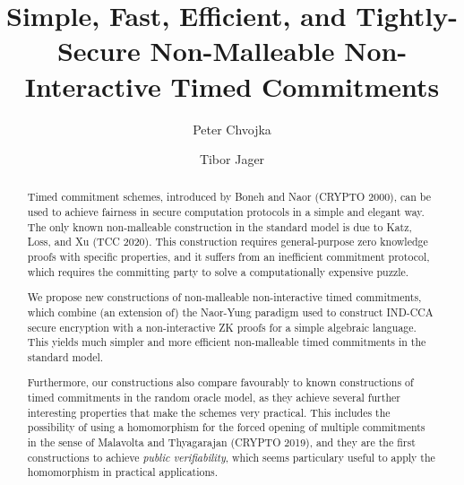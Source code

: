 \documentclass{llncs}
\author{Peter Chvojka\inst{1} \and Tibor Jager\inst{2}}
\institute{IMDEA Software Institute, \url{chvojka.p@gmail.com} \and University of Wuppertal, \url{jager@uni-wuppertal.de}}
\begin{document}
\title{Simple, Fast, Efficient, and Tightly-Secure Non-Malleable Non-Interactive Timed Commitments}


\maketitle
\begin{abstract}
Timed commitment schemes, introduced by Boneh and Naor (CRYPTO 2000), can be used to achieve fairness in secure computation protocols in a simple and elegant way.
The only known non-malleable construction in the standard model is due to Katz, Loss, and Xu (TCC 2020). This construction requires general-purpose zero knowledge proofs with specific properties, and it suffers from an inefficient commitment protocol, which requires the committing party to solve a computationally expensive puzzle.

We propose new constructions of non-malleable non-interactive timed commitments, which combine (an extension of) the Naor-Yung paradigm used to construct IND-CCA secure encryption with a non-interactive ZK proofs for a simple algebraic language. This yields much simpler and more efficient non-malleable timed commitments in the standard model.

Furthermore, our constructions also compare favourably to known constructions of timed commitments in the random oracle model, as they achieve several further interesting properties that make the schemes very practical. This includes the possibility of using a homomorphism for the forced opening of multiple commitments in the sense of Malavolta and Thyagarajan (CRYPTO 2019), and they are the first constructions to achieve \emph{public verifiability}, which seems particulary useful to apply the homomorphism in practical applications.
\end{abstract}


















\begin{appendix}

%


\end{appendix}
\end{document}
